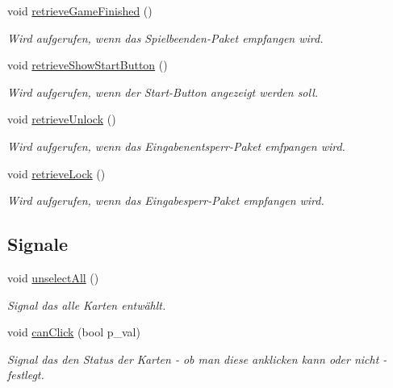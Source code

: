 \begin{DoxyCompactItemize}
void \hyperlink{class_window_ae8cc4019b78c72f11011af84c2f7dd5a}{retrieve\+Game\+Finished} ()
\begin{DoxyCompactList}\small\item\em Wird aufgerufen, wenn das Spielbeenden-\/\+Paket empfangen wird. \end{DoxyCompactList}\item 
void \hyperlink{class_window_ab182caf7adf8a0227b8758cc37127b10}{retrieve\+Show\+Start\+Button} ()
\begin{DoxyCompactList}\small\item\em Wird aufgerufen, wenn der Start-\/\+Button angezeigt werden soll. \end{DoxyCompactList}\item 
void \hyperlink{class_window_a73d77bc7266516a16a9cdeb35db957f5}{retrieve\+Unlock} ()
\begin{DoxyCompactList}\small\item\em Wird aufgerufen, wenn das Eingabenentsperr-\/\+Paket emfpangen wird. \end{DoxyCompactList}\item 
void \hyperlink{class_window_a3b749278c0ca463b77df58e7e946142f}{retrieve\+Lock} ()
\begin{DoxyCompactList}\small\item\em Wird aufgerufen, wenn das Eingabesperr-\/\+Paket empfangen wird. \end{DoxyCompactList}\end{DoxyCompactItemize}
\subsection*{Signale}
\begin{DoxyCompactItemize}
\item 
void \hyperlink{class_window_aeec812dd91b692fd9b28296aae58dd22}{unselect\+All} ()
\begin{DoxyCompactList}\small\item\em Signal das alle Karten entwählt. \end{DoxyCompactList}\item 
void \hyperlink{class_window_ab5e88ca55b5471f875b222ed853a4e4e}{can\+Click} (bool p\+\_\+val)
\begin{DoxyCompactList}\small\item\em Signal das den Status der Karten -\/ ob man diese anklicken kann oder nicht -\/ festlegt. \end{DoxyCompactList}\end{DoxyCompactItemize}
